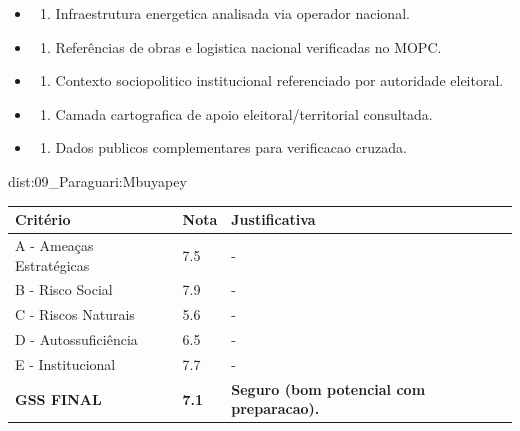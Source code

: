 {\begin{itemize}
\item
  \begin{enumerate}
  \def\labelenumi{\arabic{enumi})}
  \setcounter{enumi}{7}
  \tightlist
  \item
    Infraestrutura energetica analisada via operador nacional.
  \end{enumerate}
\item
  \begin{enumerate}
  \def\labelenumi{\arabic{enumi})}
  \setcounter{enumi}{8}
  \tightlist
  \item
    Referências de obras e logistica nacional verificadas no MOPC.
  \end{enumerate}
\item
  \begin{enumerate}
  \def\labelenumi{\arabic{enumi})}
  \setcounter{enumi}{9}
  \tightlist
  \item
    Contexto sociopolitico institucional referenciado por autoridade
    eleitoral.
  \end{enumerate}
\item
  \begin{enumerate}
  \def\labelenumi{\arabic{enumi})}
  \setcounter{enumi}{10}
  \tightlist
  \item
    Camada cartografica de apoio eleitoral/\allowbreak territorial consultada.
  \end{enumerate}
\item
  \begin{enumerate}
  \def\labelenumi{\arabic{enumi})}
  \setcounter{enumi}{11}
  \tightlist
  \item
    Dados publicos complementares para verificacao cruzada.
  \end{enumerate}
\end{itemize}}{dist:09_Paraguari:Mbuyapey}
\begin{table}[ht!]
\small \begin{tabular}{p{3.0cm}p{0.8cm}p{6.0cm}} \toprule
\textbf{Critério} & \textbf{Nota} & \textbf{Justificativa} \\ \midrule
A - Ameaças Estratégicas & 7.5 & - \\
B - Risco Social & 7.9 & - \\
C - Riscos Naturais & 5.6 & - \\
D - Autossuficiência & 6.5 & - \\
E - Institucional & 7.7 & - \\
\midrule \textbf{GSS FINAL} & \textbf{7.1} & \textbf{Seguro (bom potencial com preparacao).} \\ \bottomrule \end{tabular}
\end{table}
